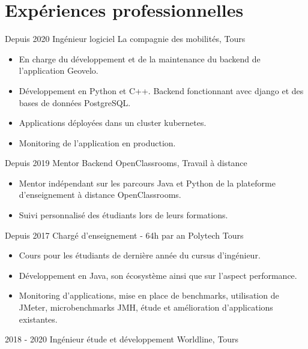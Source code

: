 \documentclass[]{friggeri-cv}
\begin{document}
\section{Expériences professionnelles}
\vspace{-5pt}
\begin{entrylist}
  \entry
  {Depuis 2020}
    {Ingénieur logiciel}
    {La compagnie des mobilités, Tours}
    {
    \vspace{-0.8\baselineskip}
	\begin{itemize}[leftmargin=*]
		\item En charge du développement et de la maintenance du backend de l'application Geovelo.
		\item Développement en Python et C++. Backend fonctionnant avec django et des bases de données PostgreSQL.
		\item Applications déployées dans un cluster kubernetes.
		\item Monitoring de l'application en production.
	\end{itemize}
	}
      \entry
    {Depuis 2019}
    {Mentor Backend}
    {OpenClassrooms, Travail à distance}
    {
    \vspace{-0.8\baselineskip}
	\begin{itemize}[leftmargin=*]
		\item Mentor indépendant sur les parcours Java et Python de la plateforme d'enseignement à distance OpenClassrooms.
		\item Suivi personnalisé des étudiants lors de leurs formations.
	\end{itemize}
	}
  \entry
    {Depuis 2017}
    {Chargé d'enseignement - 64h par an}
    {Polytech Tours}
    {
    \vspace{-0.8\baselineskip}
	\begin{itemize}[leftmargin=*]
		\item Cours pour les étudiants de dernière année du cursus d'ingénieur.
		\item Développement en Java, son écosystème ainsi que sur l'aspect performance.
		\item Monitoring d'applications, mise en place de benchmarks, utilisation de JMeter, microbenchmarks JMH, étude et amélioration d'applications existantes.
	\end{itemize}
	}
    \entry
    {2018 - 2020}
    {Ingénieur étude et développement}
    {Worldline, Tours}
    {
    \vspace{-0.8\baselineskip}
	\begin{itemize}[leftmargin=*]

\end{itemize}}
\end{entrylist}
\end{document}
